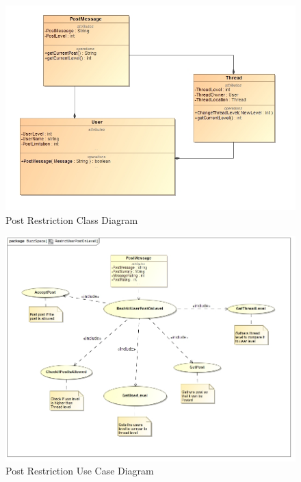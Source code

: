 \documentclass[11pt]{article}
\begin{document}
\begin{enumerate}
\begin{itemize}
	 \graphicspath{ {../Diagrams/Andrew/} }
			\begin{figure}[H]	
			  	\includegraphics[scale=0.5,center]{B1ClassDiagram.png}
				\caption{Post Restriction Class Diagram}
			\end{figure}
			
			\begin{figure}[H]	
			 	\includegraphics[scale=0.5,center]{B1UseCase.png}
				\caption{Post Restriction Use Case Diagram}
			\end{figure}


\end{itemize}
\end{enumerate}
\end{document}
